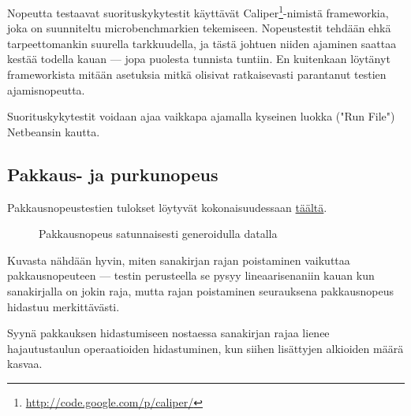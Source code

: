 \documentclass{article}
\begin{document}
Nopeutta testaavat suorituskykytestit käyttävät Caliper\footnote{\url{http://code.google.com/p/caliper/}}-nimistä frameworkia, joka on suunniteltu microbenchmarkien tekemiseen. Nopeustestit tehdään ehkä tarpeettomankin suurella tarkkuudella, ja tästä johtuen niiden ajaminen saattaa kestää todella kauan --- jopa puolesta tunnista tuntiin. En kuitenkaan löytänyt frameworkista mitään asetuksia mitkä olisivat ratkaisevasti parantanut testien ajamisnopeutta.

Suorituskykytestit voidaan ajaa vaikkapa ajamalla kyseinen luokka ("Run File") Netbeansin kautta.

\subsection{Pakkaus- ja purkunopeus}
Pakkausnopeustestien tulokset löytyvät kokonaisuudessaan \href{http://microbenchmarks.appspot.com/run/kauhsa@viuhka.fi/kauhsa.compression.lzw.benchmarks.PerformanceBenchmark}{täältä}.

\begin{figure}[h]
\centering
{}
\caption{Pakkausnopeus satunnaisesti generoidulla datalla}
\end{figure}

Kuvasta nähdään hyvin, miten sanakirjan rajan poistaminen vaikuttaa pakkausnopeuteen --- testin perusteella se pysyy lineaarisenaniin kauan kun sanakirjalla on jokin raja, mutta rajan poistaminen seurauksena pakkausnopeus hidastuu merkittävästi.

Syynä pakkauksen hidastumiseen nostaessa sanakirjan rajaa lienee hajautustaulun operaatioiden hidastuminen, kun siihen lisättyjen alkioiden määrä kasvaa.
\end{document}
